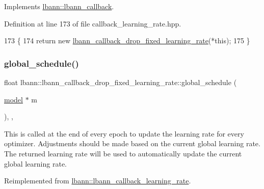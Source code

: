 Implements \hyperlink{classlbann_1_1lbann__callback_a9f545d1269a8c7af335625d049691f26}{lbann\+::lbann\+\_\+callback}.



Definition at line 173 of file callback\+\_\+learning\+\_\+rate.\+hpp.


\begin{DoxyCode}
173                                                                  \{
174     \textcolor{keywordflow}{return} \textcolor{keyword}{new} \hyperlink{classlbann_1_1lbann__callback__drop__fixed__learning__rate_a28f58eb50813e638d865179d645908f2}{lbann\_callback\_drop\_fixed\_learning\_rate}(*\textcolor{keyword}{this});
175   \}
\end{DoxyCode}
\mbox{\label{classlbann_1_1lbann__callback__drop__fixed__learning__rate_a2ee62bfde00d7f1a4e55e4a334160fbe}} 
\subsubsection{\texorpdfstring{global\+\_\+schedule()}{global\_schedule()}}
{\footnotesize\ttfamily float lbann\+::lbann\+\_\+callback\+\_\+drop\+\_\+fixed\+\_\+learning\+\_\+rate\+::global\+\_\+schedule (\begin{DoxyParamCaption}\item[{\hyperlink{classlbann_1_1model}{model} $\ast$}]{m }\end{DoxyParamCaption})\hspace{0.3cm}{\ttfamily [override]}, {\ttfamily [protected]}, {\ttfamily [virtual]}}

This is called at the end of every epoch to update the learning rate for every optimizer. Adjustments should be made based on the current global learning rate. The returned learning rate will be used to automatically update the current global learning rate. 

Reimplemented from \hyperlink{classlbann_1_1lbann__callback__learning__rate_a7869b93e5963d6f76da68d8c8137b979}{lbann\+::lbann\+\_\+callback\+\_\+learning\+\_\+rate}.



